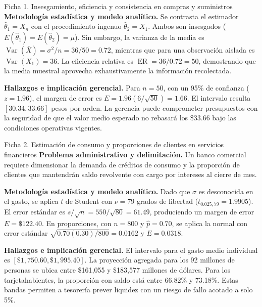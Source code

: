{\begin{fichainvestigacion}{Ficha 1. Insesgamiento, eficiencia y consistencia en compras y suministros}
\textbf{Metodología estadística y modelo analítico.} Se contrasta el estimador $\hat{\theta}_1 = \bar{X}_n$ con el procedimiento ingenuo $\hat{\theta}_2 = X_1$. Ambos son insesgados ($E(\hat{\theta}_1) = E(\hat{\theta}_2) = \mu$). Sin embargo, la varianza de la media es $\operatorname{Var}(\bar{X}) = \sigma^2/n = 36/50 = 0.72$, mientras que para una observación aislada es $\operatorname{Var}(X_1) = 36$. La eficiencia relativa es $\operatorname{ER} = 36/0.72 = 50$, demostrando que la media muestral aprovecha exhaustivamente la información recolectada.

\textbf{Hallazgos e implicación gerencial.} Para $n = 50$, con un 95\% de confianza ($z = 1.96$), el margen de error es $E = 1.96(6/\sqrt{50}) = 1.66$. El intervalo resulta $[30.34, 33.66]$ pesos por orden. La gerencia puede comprometer presupuestos con la seguridad de que el valor medio esperado no rebasará los \$33.66 bajo las condiciones operativas vigentes.
\end{fichainvestigacion}

\begin{fichainvestigacion}{Ficha 2. Estimación de consumo y proporciones de clientes en servicios financieros}
\textbf{Problema administrativo y delimitación.} Un banco comercial requiere dimensionar la demanda de créditos de consumo y la proporción de clientes que mantendrán saldo revolvente con cargo por intereses al cierre de mes.

\textbf{Metodología estadística y modelo analítico.} Dado que $\sigma$ es desconocida en el gasto, se aplica $t$ de Student con $\nu = 79$ grados de libertad ($t_{0.025, 79} = 1.9905$). El error estándar es $s/\sqrt{n} = 550/\sqrt{80} = 61.49$, produciendo un margen de error $E = \$122.40$. En proporciones, con $n = 800$ y $\hat{p} = 0.70$, se aplica la normal con error estándar $\sqrt{0.70(0.30)/800} = 0.0162$ y $E = 0.0318$.

\textbf{Hallazgos e implicación gerencial.} El intervalo para el gasto medio individual es $[\$1,750.60, \$1,995.40]$. La proyección agregada para los 92 millones de personas se ubica entre \$161,055 y \$183,577 millones de dólares. Para los tarjetahabientes, la proporción con saldo está entre 66.82\% y 73.18\%. Estas bandas permiten a tesorería prever liquidez con un riesgo de fallo acotado a solo 5\%.
\end{fichainvestigacion}

}
